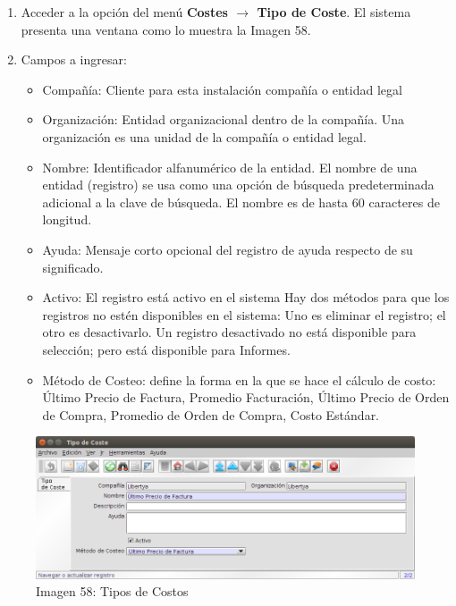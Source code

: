 \documentclass[letterpaper,10pt,spanish]{sphinxmanual}
\begin{document}
\begin{enumerate}
\item {} 
Acceder a la opción del menú \textbf{Costes \(\rightarrow\) Tipo de Coste}. El sistema presenta una ventana como lo muestra la Imagen 58.

\item {} 
Campos a ingresar:
\begin{itemize}
\item {} 
Compañía: Cliente para esta instalación compañía o entidad legal

\item {} 
Organización: Entidad organizacional dentro de la compañía. Una organización es una unidad de la compañía o entidad legal.

\item {} 
Nombre: Identificador alfanumérico de la entidad. El nombre de una entidad (registro) se usa como una opción de búsqueda predeterminada adicional a la clave de búsqueda. El nombre es de hasta 60 caracteres de longitud.

\item {} 
Ayuda: Mensaje corto opcional del registro de ayuda respecto de su significado.

\item {} 
Activo: El registro está activo en el sistema Hay dos métodos para que los registros no estén disponibles en el sistema: Uno es eliminar el registro; el otro es desactivarlo. Un registro desactivado no está disponible para selección; pero está disponible para Informes.

\item {} 
Método de Costeo: define la forma en la que se hace el cálculo de costo: Último Precio de Factura, Promedio Facturación, Último Precio de Orden de Compra, Promedio de Orden de Compra, Costo Estándar.

\end{itemize}

\end{enumerate}
\begin{figure}[htbp]
\centering
\capstart

\includegraphics{ly_tipocosto.png}
\caption{Imagen 58: Tipos de Costos}\end{figure}
\end{document}
